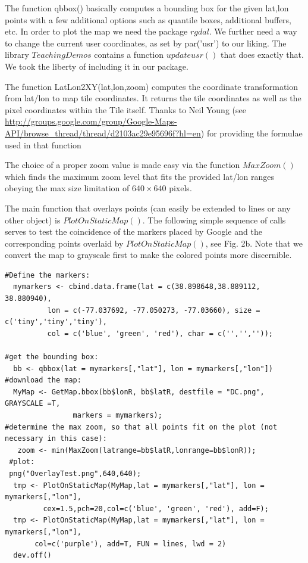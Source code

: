 \documentclass{article}
\begin{document}
\noindent The function qbbox() basically computes a bounding box for the given lat,lon points with a few additional options such as quantile boxes, additional buffers, etc.
In order to plot the map we need the package $rgdal$.
We further need a way to change the current user coordinates, as set by par('usr') to our liking. The library $TeachingDemos$ contains a function $updateusr()$ that does exactly that. We took the liberty of including it in our package.

\noindent The function LatLon2XY(lat,lon,zoom) computes the coordinate transformation from lat/lon to map tile coordinates. 
It returns the tile coordinates as well as the pixel coordinates within the Tile itself.
Thanks to Neil Young (see \url{http://groups.google.com/group/Google-Maps-API/browse_thread/thread/d2103ac29e95696f?hl=en}) for providing the formulae used in that function

\noindent The choice of a proper zoom value is made easy via the function $MaxZoom()$ which finds the maximum zoom level that fits the provided lat/lon ranges obeying the max size limitation of $640 \times 640$ pixels.

\noindent The main function that overlays points (can easily be extended to lines or any other object) is $PlotOnStaticMap()$.
The following simple sequence of calls serves to test the coincidence of the markers placed by Google and the corresponding points overlaid by $PlotOnStaticMap()$, see Fig. 2b. Note that we convert the map to grayscale first to make the colored points more discernible.
\begin{verbatim}
#Define the markers:
  mymarkers <- cbind.data.frame(lat = c(38.898648,38.889112, 38.880940), 
          lon = c(-77.037692, -77.050273, -77.03660), size =  c('tiny','tiny','tiny'), 
          col = c('blue', 'green', 'red'), char = c('','',''));

#get the bounding box:
  bb <- qbbox(lat = mymarkers[,"lat"], lon = mymarkers[,"lon"])
#download the map:
  MyMap <- GetMap.bbox(bb$lonR, bb$latR, destfile = "DC.png", GRAYSCALE =T,
                markers = mymarkers);
#determine the max zoom, so that all points fit on the plot (not necessary in this case):  
   zoom <- min(MaxZoom(latrange=bb$latR,lonrange=bb$lonR));
 #plot:
 png("OverlayTest.png",640,640);
  tmp <- PlotOnStaticMap(MyMap,lat = mymarkers[,"lat"], lon = mymarkers[,"lon"], 
         cex=1.5,pch=20,col=c('blue', 'green', 'red'), add=F);
  tmp <- PlotOnStaticMap(MyMap,lat = mymarkers[,"lat"], lon = mymarkers[,"lon"], 
       col=c('purple'), add=T, FUN = lines, lwd = 2)
  dev.off()
\end{verbatim}
\end{document}
